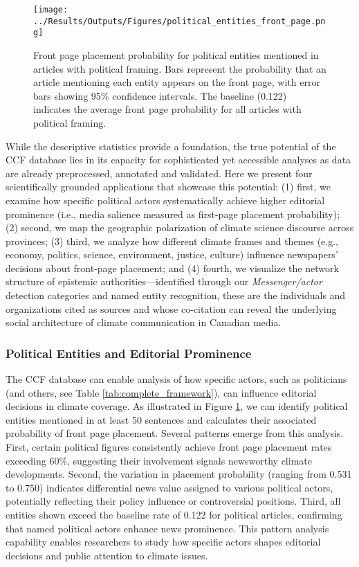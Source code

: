 \documentclass[12pt]{article}
\begin{document}
\begin{figure}[!b]
\vspace*{\fill}
\centering
\texttt{[image: ../Results/Outputs/Figures/political\_entities\_front\_page.png]}
\caption{Front page placement probability for political entities mentioned in articles with political framing. Bars represent the probability that an article mentioning each entity appears on the front page, with error bars showing 95\% confidence intervals. The baseline (0.122) indicates the average front page probability for all articles with political framing.}
\label{fig:political_entities}
\vspace*{0pt}
\end{figure}

While the descriptive statistics provide a foundation, the true potential of the CCF database lies in its capacity for sophisticated yet accessible analyses as data are already preprocessed, annotated and validated. Here we present four scientifically grounded applications that showcase this potential: (1) first, we examine how specific political actors systematically achieve higher editorial prominence (i.e., media salience measured as first-page placement probability); (2) second, we map the geographic polarization of climate science discourse across provinces; (3) third, we analyze how different climate frames and themes (e.g., economy, politics, science, environment, justice, culture) influence newspapers' decisions about front-page placement; and (4) fourth, we visualize the network structure of epistemic authorities—identified through our \emph{Messenger/actor} detection categories and named entity recognition, these are the individuals and organizations cited as sources and whose co-citation can reveal the underlying social architecture of climate communication in Canadian media.


\subsubsection{Political Entities and Editorial Prominence}

The CCF database can enable analysis of how specific actors, such as politicians (and others, see Table \ref{tab:complete_framework}), can influence editorial decisions in climate coverage. As illustrated in Figure \ref{fig:political_entities}, we can identify political entities mentioned in at least 50 sentences and calculates their associated probability of front page placement. Several patterns emerge from this analysis. First, certain political figures consistently achieve front page placement rates exceeding 60\%, suggesting their involvement signals newsworthy climate developments. Second, the variation in placement probability (ranging from 0.531 to 0.750) indicates differential news value assigned to various political actors, potentially reflecting their policy influence or controversial positions. Third, all entities shown exceed the baseline rate of 0.122 for political articles, confirming that named political actors enhance news prominence. This pattern analysis capability enables researchers to study how specific actors shapes editorial decisions and public attention to climate issues.
\end{document}
